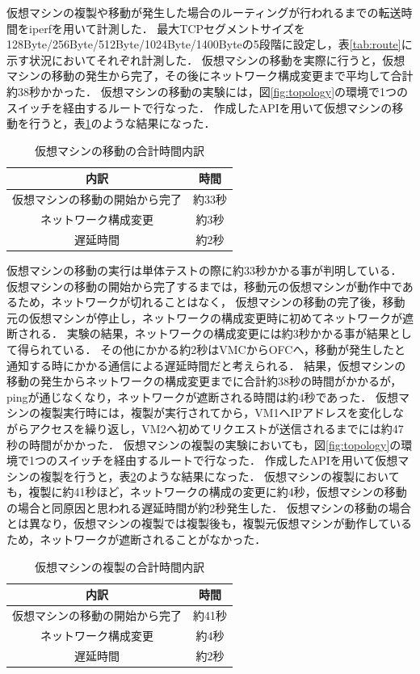 \documentclass[submit,techrep]{ipsj}
\begin{document}
仮想マシンの複製や移動が発生した場合のルーティングが行われるまでの転送時間をiperf\cite{iperf}を用いて計測した．
最大TCPセグメントサイズを128Byte/256Byte/512Byte/1024Byte/1400Byteの5段階に設定し，表\ref{tab:route}に示す状況においてそれぞれ計測した．
仮想マシンの移動を実際に行うと，仮想マシンの移動の発生から完了，その後にネットワーク構成変更まで平均して合計約38秒かかった．
仮想マシンの移動の実験には，図\ref{fig:topology}の環境で1つのスイッチを経由するルートで行なった．
作成したAPIを用いて仮想マシンの移動を行うと，表\ref{tab:times}のような結果になった．
\begin{table}[tb]
	\centering
	\caption{仮想マシンの移動の合計時間内訳}
	\label{tab:times}
	\vspace{4mm}
	{
		\begin{tabular}{ c c } \hline
      内訳 & 時間 \\ \hline \hline
      仮想マシンの移動の開始から完了 & 約33秒 \\
			ネットワーク構成変更 & 約3秒 \\
			遅延時間 & 約2秒 \\ \hline
		\end{tabular}
	}
\end{table}
仮想マシンの移動の実行は単体テストの際に約33秒かかる事が判明している．
仮想マシンの移動の開始から完了するまでは，移動元の仮想マシンが動作中であるため，ネットワークが切れることはなく，
仮想マシンの移動の完了後，移動元の仮想マシンが停止し，ネットワークの構成変更時に初めてネットワークが遮断される．
実験の結果，ネットワークの構成変更には約3秒かかる事が結果として得られている．
その他にかかる約2秒はVMCからOFCへ，移動が発生したと通知する時にかかる通信による遅延時間だと考えられる．
結果，仮想マシンの移動の発生からネットワークの構成変更までに合計約38秒の時間がかかるが，pingが通じなくなり，ネットワークが遮断される時間は約4秒であった．
仮想マシンの複製実行時には，複製が実行されてから，VM1へIPアドレスを変化しながらアクセスを繰り返し，VM2へ初めてリクエストが送信されるまでには約47秒の時間がかかった．
仮想マシンの複製の実験においても，図\ref{fig:topology}の環境で1つのスイッチを経由するルートで行なった．
作成したAPIを用いて仮想マシンの複製を行うと，表\ref{tab:ctimes}のような結果になった．
仮想マシンの複製においても，複製に約41秒ほど，ネットワークの構成の変更に約4秒，仮想マシンの移動の場合と同原因と思われる遅延時間が約2秒発生した．
仮想マシンの移動の場合とは異なり，仮想マシンの複製では複製後も，複製元仮想マシンが動作しているため，ネットワークが遮断されることがなかった．

\begin{table}[tb]
	\centering
	\caption{仮想マシンの複製の合計時間内訳}
	\label{tab:ctimes}
	\vspace{4mm}
	{
		\begin{tabular}{ c c } \hline
      内訳 & 時間 \\ \hline \hline
      仮想マシンの移動の開始から完了 & 約41秒 \\
			ネットワーク構成変更 & 約4秒 \\
			遅延時間 & 約2秒 \\ \hline
		\end{tabular}
	}
\end{table}
\end{document}

